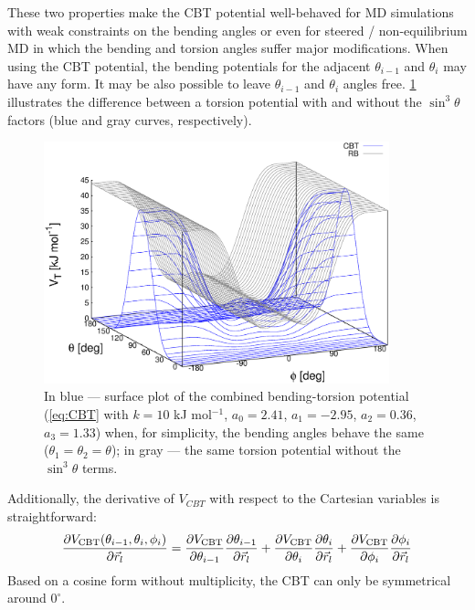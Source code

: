 These two  properties make the CBT potential well-behaved for MD simulations with weak constraints
on the bending angles or even for steered / non-equilibrium MD in which the bending and torsion angles suffer major
modifications.
When using the CBT potential, the bending potentials for the adjacent $\theta_{i-1}$ and $\theta_i$ may have any form.
It may be also possible to leave $\theta_{i-1}$ and $\theta_{i}$ angles free.
\ref{CBT} illustrates the difference between a torsion potential with and without the $\sin^{3}\theta$ factors
(blue and gray curves, respectively).
%
\begin{figure}
\centerline{\includegraphics[width=10cm]{plots/fig-04}}
\caption{In blue --- surface plot of the combined bending-torsion potential
(\ref{eq:CBT} with $k = 10$ kJ mol$^{-1}$, $a_0=2.41$, $a_1=-2.95$, $a_2=0.36$, $a_3=1.33$)
when, for simplicity, the bending angles behave the same ($\theta_1=\theta_2=\theta$);
in gray --- the same torsion potential without the $\sin^{3}\theta$ terms.}
\label{CBT} 
\end{figure}
%
Additionally, the derivative of $V_{CBT}$ with respect to the Cartesian variables is straightforward:
%
\begin{equation}
\frac{\partial V_{\rm CBT}(\theta_{i-1},\theta_i,\phi_i)} {\partial \vec r_{l}} = \frac{\partial V_{\rm CBT}}{\partial \theta_{i-1}} \frac{\partial \theta_{i-1}}{\partial \vec r_{l}} +
                                                                                  \frac{\partial V_{\rm CBT}}{\partial \theta_{i  }} \frac{\partial \theta_{i  }}{\partial \vec r_{l}} +
                                                                                  \frac{\partial V_{\rm CBT}}{\partial \phi_{i    }} \frac{\partial \phi_{i    }}{\partial \vec r_{l}}
\label{eq:force_cbt}
\end{equation}
%
Based on a cosine form without multiplicity, the CBT can only be symmetrical around $0^{\circ}$.
